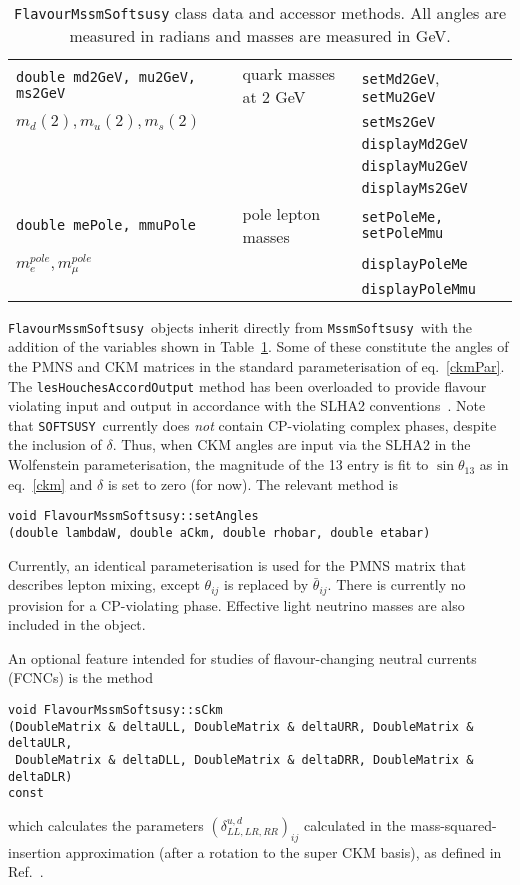 \documentclass[]{article}
\def\SOFTSUSY{{\tt SOFTSUSY}}
\def\code#1{\small{\tt #1}\normalsize}
\begin{document}
\begin{table}
\begin{center}
\begin{tabular}{lll}
\code{double md2GeV, mu2GeV, ms2GeV} & quark masses at 2 GeV &
\code{setMd2GeV}, \code{setMu2GeV} \\
$m_d(2), m_u(2), m_s(2)$ 
 & & \code{setMs2GeV} \\
 & & \code{displayMd2GeV} \\
 & & \code{displayMu2GeV} \\
 & & \code{displayMs2GeV} \\ \hline
\code{double mePole, mmuPole} & pole lepton masses & \code{setPoleMe,
  setPoleMmu} \\
$m_e^{pole}, m_\mu^{pole}$ & & \code{displayPoleMe} \\
 & & \code{displayPoleMmu} \\
\end{tabular}\caption{\label{tab:flavsoft}\code{FlavourMssmSoftsusy} class data and accessor methods. All angles are
  measured in radians and masses are measured in GeV.}\end{center}\end{table}
\code{FlavourMssmSoftsusy}~objects inherit directly from
\code{MssmSoftsusy}~with the addition of the variables shown in
Table~\ref{tab:flavsoft}.
Some of these
constitute the angles of the PMNS and CKM matrices in the standard
parameterisation of 
eq.~\ref{ckmPar}. The
\code{lesHouchesAccordOutput} method has been overloaded to provide flavour
violating input and output in accordance with the SLHA2
conventions~\cite{lhacc2}. Note that \SOFTSUSY~currently does {\em not}\/
contain CP-violating complex phases, despite the inclusion of $\delta$. Thus,
when CKM angles are input via the 
SLHA2 in the Wolfenstein parameterisation, the magnitude of the 13 entry 
is fit to $\sin \theta_{13}$ as in eq.~\ref{ckm} and $\delta$ is set to zero
(for now). The relevant method is
\small
\begin{verbatim}
void FlavourMssmSoftsusy::setAngles
(double lambdaW, double aCkm, double rhobar, double etabar) 
\end{verbatim}
\normalsize
Currently, an identical parameterisation is used for the PMNS
matrix that describes lepton mixing, except $\theta_{ij}$ is replaced by
${\bar \theta}_{ij}$. There is currently no provision for a CP-violating phase. 
Effective light neutrino masses 
are also included in the object. 

An optional feature intended for studies of flavour-changing neutral
currents (FCNCs) is the method 
\begin{verbatim}
void FlavourMssmSoftsusy::sCkm
(DoubleMatrix & deltaULL, DoubleMatrix & deltaURR, DoubleMatrix & deltaULR, 
 DoubleMatrix & deltaDLL, DoubleMatrix & deltaDRR, DoubleMatrix & deltaDLR) 
const
\end{verbatim}
which calculates the parameters $(\delta^{u,d}_{LL,LR,RR})_{ij}$ calculated in
the mass-squared-insertion 
approximation (after a rotation to the super CKM basis), as defined
in Ref.~\cite{Gabbiani:1996hi}. 
\end{document}
